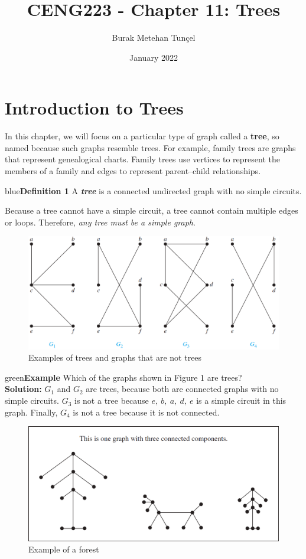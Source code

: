\documentclass{article}
\title{CENG223 - Chapter 11: Trees}
\author{Burak Metehan Tunçel}
\date{January 2022}
\begin{document}
\maketitle

\section{Introduction to Trees}

In this chapter, we will focus on a particular type of graph called a \textbf{tree}, so named because such graphs resemble trees. For example, family trees are graphs that represent genealogical charts. Family trees use vertices to represent the members of a family and edges to represent parent–child relationships.

\begin{mybox}{blue}{\textbf{Definition 1}}
A \textbf{\textit{tree}} is a connected undirected graph with no simple circuits.
\end{mybox}

Because a tree cannot have a simple circuit, a tree cannot contain multiple edges or loops. Therefore, \textit{any tree must be a simple graph}.

\begin{figure}[h!]
    \centering
    \includegraphics[width=.5\textwidth]{img/ch11-figure2.png}
    \caption{Examples of trees and graphs that are not trees}
    \label{fig:my_label}
\end{figure}
\begin{mybox}{green}{\textbf{Example}}
Which of the graphs shown in Figure 1 are trees?\\
\textbf{Solution:} $G_1$ and $G_2$ are trees, because both are connected graphs with no simple circuits. $G_3$ is not a tree because $e,\ b,\ a,\ d,\ e$ is a simple circuit in this graph. Finally, $G_4$ is not a tree because it is not connected.
\end{mybox}



\begin{figure}
    \centering
    \includegraphics[width=.48\textwidth]{img/ch11-figure3.png}
    \caption{Example of a forest}
    \label{fig:my_label}
\end{figure}
\end{document}
